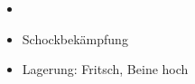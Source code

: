 \label{m:uterusruptur}
\begin{itemize}
	\item \TxMassVitMK
	\item Schockbekämpfung
	\item Lagerung: Fritsch, Beine hoch
\end{itemize}